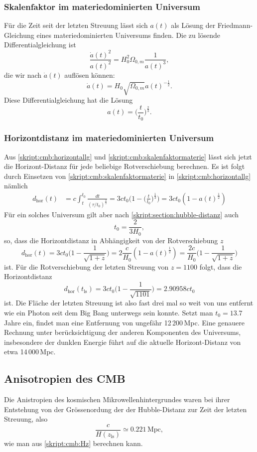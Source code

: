 \subsubsection{Skalenfaktor im materiedominierten Universum}
Für die Zeit seit der letzten Streuung lässt sich $a(t)$ als
Lösung der Friedmann-Gleichung eines materiedominierten
Universums finden.
Die zu lösende Differentialgleichung ist
\[
\frac{\dot a(t)^2}{a(t)^2}
=
H_0^2\Omega_{0,m}\frac1{a(t)^3},
\]
die wir nach $\dot a(t)$ auflösen können:
\[
\dot a(t)
=
H_0\sqrt{\Omega_{0,m}} a(t)^{-\frac12}.
\]
Diese Differentialgleichung hat die Lösung
\begin{equation}
a(t) = \biggl(\frac{t}{t_0}\biggr)^\frac23.
\label{skript:cmb:skalenfaktormaterie}
\end{equation}

\subsubsection{Horizontdistanz im materiedominierten Universum}
Aus
\eqref{skript:cmb:horizontallg}
und
\eqref{skript:cmb:skalenfaktormaterie}
lässt sich jetzt die Horizont-Distanz für jede beliebige 
Rotverschiebung berechnen.
Es ist folgt durch Einsetzen von
\eqref{skript:cmb:skalenfaktormaterie}
in
\eqref{skript:cmb:horizontallg}
nämlich
\begin{align*}
d_{\text{hor}}(t)
&=
c\int_t^{t_0} \frac{dt}{(\tau/t_0)^\frac23}
=
3ct_0\biggl(1-\biggl(\frac{t}{t_0}\biggr)^\frac13\biggr)
=
3ct_0(1-a(t)^\frac12)
\end{align*}
Für ein solches Universum gilt aber nach
\eqref{skript:section:hubble-distanz}
auch 
\[
t_0=\frac{2}{3H_0},
\]
so, dass die Horizontdistanz in Abhängigkeit von der Rotverschiebung $z$
\[
d_{\text{hor}}(t)
=
3ct_0\biggl(1-\frac1{\sqrt{1+z}}\biggr)
=
2\frac{c}{H_0}(1-a(t)^\frac12)
=
\frac{2c}{H_0}\biggl(1-\frac{1}{\sqrt{1+z}}\biggr)
\]
ist.
Für die Rotverschiebung der letzten Streuung von $z=1100$ folgt, dass
die Horizontdistanz
\[
d_{\text{hor}}(t_{\text{ls}})
=
3ct_0 \biggl(1-\frac{1}{\sqrt{1101}}\biggr)
=
2.90958 ct_0
\]
ist.
Die Fläche der letzten Streuung ist also fast drei mal so weit von uns
entfernt wie ein Photon seit dem Big Bang unterwegs sein konnte.
Setzt man $t_0=13.7$\,Jahre ein, findet man eine Entfernung von ungefähr 
12\,200\,Mpc.
Eine genauere Rechnung unter berücksichtigung der anderen Komponenten
des Universums, insbesondere der dunklen Energie führt auf die
aktuelle Horizont-Distanz von etwa 14\,000\,Mpc.

\subsection{Anisotropien des CMB}
Die Anistropien des kosmischen Mikrowellenhintergrundes waren
bei ihrer Entstehung von der Grössenordung der der Hubble-Distanz zur
Zeit der letzten Streuung, also
\[
\frac{c}{H(z_{\text{ls}})}
\simeq
0.221\,\text{Mpc},
\]
wie man aus \eqref{skript:cmb:Hz} berechnen kann.


